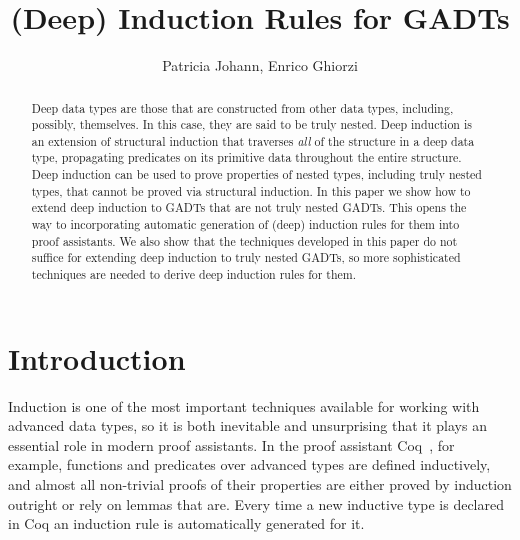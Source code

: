 \documentclass[sigplan,10pt,anonymous,review]{acmart}
\begin{document}
\title[(Deep) Induction Rules for GADTs]{(Deep) Induction Rules for GADTs}
  \author{Patricia Johann, Enrico Ghiorzi}

    
\begin{abstract} 
  Deep data types are those that are constructed from other data types,
  including, possibly, themselves.  In this case, they are said to be
  truly nested.  Deep induction is an extension of structural
  induction that traverses {\em all} of the structure in a deep data
  type, propagating predicates on its primitive data throughout the
  entire structure.  Deep induction can be used to prove properties of
  nested types, including truly nested types, that cannot be proved
  via structural induction.  In this paper we show how to extend deep
  induction to GADTs that are not truly nested GADTs.  This opens the
  way to incorporating automatic generation of (deep) induction rules
  for them into proof assistants.  We also show that the techniques
  developed in this paper do not suffice for extending deep induction
  to truly nested GADTs, so more sophisticated techniques are needed
  to derive deep induction rules for them.
\end{abstract}

\maketitle

\vspace*{-0.1in}

\section{Introduction}\label{sec:intro}

Induction is one of the most important techniques available for
working with advanced data types, so it is both inevitable and
unsurprising that it plays an essential role in modern proof
assistants. In the proof assistant Coq~\cite{coq20}, for example,
functions and predicates over advanced types are defined inductively,
and almost all non-trivial proofs of their properties are either
proved by induction outright or rely on lemmas that are.  Every time a
new inductive type is declared in Coq an induction rule is
automatically generated for it.
\end{document}
